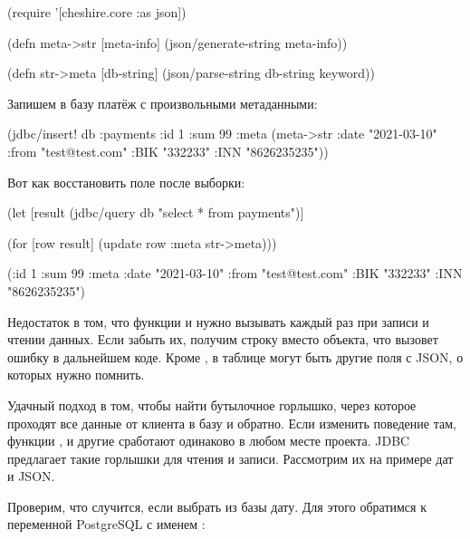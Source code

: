 \begin{english}
  \begin{clojure}
(require '[cheshire.core :as json])

(defn meta->str
  [meta-info]
  (json/generate-string meta-info))

(defn str->meta
  [db-string]
  (json/parse-string db-string keyword))
  \end{clojure}
\end{english}

Запишем в базу платёж с произвольными метаданными:

\begin{english}
  \begin{clojure}
(jdbc/insert!
 db
 :payments
 {:id 1
  :sum 99
  :meta (meta->str
          {:date "2021-03-10"
           :from "test@test.com"
           :BIK "332233"
           :INN "8626235235"})})
  \end{clojure}
\end{english}

Вот как восстановить поле  после выборки:

\begin{english}
  \begin{clojure}
(let [result
      (jdbc/query db "select * from payments")]

  (for [row result]
    (update row :meta str->meta)))

({:id 1
  :sum 99
  :meta {:date "2021-03-10"
         :from "test@test.com"
         :BIK "332233"
         :INN "8626235235"}})
  \end{clojure}
\end{english}

Недостаток в том, что функции  и  нужно вызывать каждый раз при записи и чтении данных. Если забыть их, получим строку вместо объекта, что вызовет ошибку в дальнейшем коде. Кроме , в таблице могут быть другие поля с JSON, о которых нужно помнить.

Удачный подход в том, чтобы найти бутылочное горлышко, через которое проходят все данные от клиента в базу и обратно. Если изменить поведение там, функции ,  и другие сработают одинаково в любом месте проекта. JDBC предлагает такие горлышки для чтения и записи. Рассмотрим их на примере дат и JSON.


Проверим, что случится, если выбрать из базы дату. Для этого обратимся к переменной PostgreSQL с именем :

